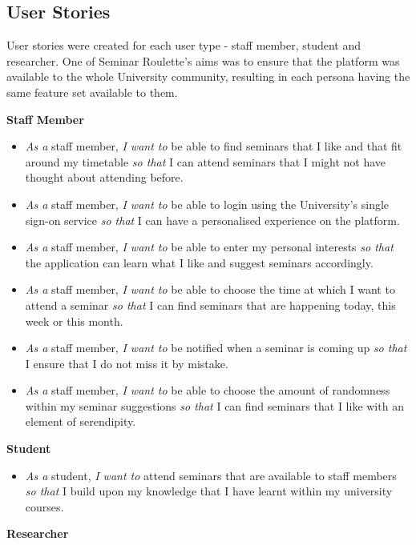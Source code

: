 \documentclass{l4proj}
\begin{document}
\subsection{User Stories}

User stories were created for each user type - staff member, student and researcher. One of Seminar Roulette's aims was to ensure that the platform was available to the whole University community, resulting in each persona having the same feature set available to them.

\textbf{Staff Member}

\begin{itemize}
    \item \emph{As a} staff member, \emph{I want to} be able to find seminars that I like and that fit around my timetable \emph{so that} I can attend seminars that I might not have thought about attending before.
    \item \emph{As a} staff member, \emph{I want to} be able to login using the University's single sign-on service \emph{so that} I can have a personalised experience on the platform.
    \item \emph{As a} staff member, \emph{I want to} be able to enter my personal interests \emph{so that} the application can learn what I like and suggest seminars accordingly.
    \item \emph{As a} staff member, \emph{I want to} be able to choose the time at which I want to attend a seminar \emph{so that} I can find seminars that are happening today, this week or this month.
    \item \emph{As a} staff member, \emph{I want to} be notified when a seminar is coming up \emph{so that} I ensure that I do not miss it by mistake.
    \item \emph{As a} staff member, \emph{I want to} be able to choose the amount of randomness within my seminar suggestions \emph{so that} I can find seminars that I like with an element of serendipity.
\end{itemize}

\textbf{Student}

\begin{itemize}
    \item \emph{As a} student, \emph{I want to} attend seminars that are available to staff members \emph{so that} I build upon my knowledge that I have learnt within my university courses.
\end{itemize}

\textbf{Researcher}
\end{document}
